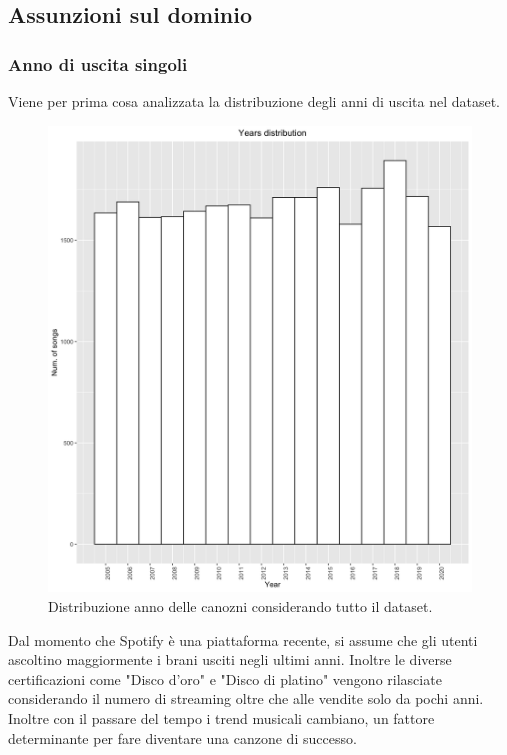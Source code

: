 \subsection{Assunzioni sul dominio}
\label{sec:assunzioni}
\subsubsection{Anno di uscita singoli}
Viene per prima cosa analizzata la distribuzione degli anni di uscita nel dataset.

\begin{figure}[H]
	\centering
	\includegraphics[width=13cm]{../images/years_distribution.png}
	\caption{Distribuzione anno delle canozni considerando tutto il dataset.}
	\label{fig:year_distribution_all}
\end{figure}

Dal momento che Spotify è una piattaforma recente, si assume che gli utenti ascoltino maggiormente i brani usciti negli ultimi anni. Inoltre le diverse certificazioni come "Disco d'oro" e "Disco di platino" vengono rilasciate considerando il numero di streaming oltre che alle vendite solo da pochi anni. Inoltre con il passare del tempo i trend musicali cambiano, un fattore determinante per fare diventare una canzone di successo.

